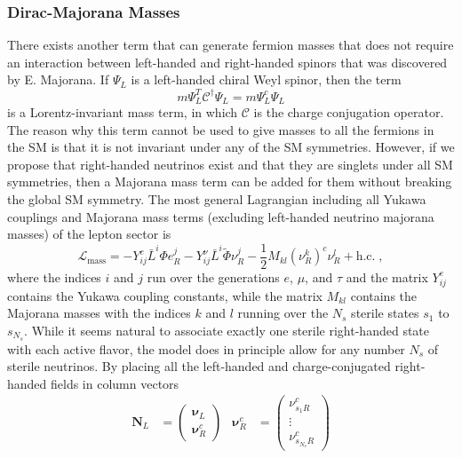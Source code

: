 \subsubsection{Dirac-Majorana Masses}

There exists another term that can generate fermion masses that does not require an interaction between left-handed and right-handed spinors that was discovered by E. Majorana. If $\Psi_L$ is a left-handed chiral Weyl spinor, then the term
\begin{equation}
   m \Psi_L^T \mathcal{C}^\dag \Psi_L = m \Psi_L^c \Psi_L
\end{equation}
is a Lorentz-invariant mass term, in which $\mathcal{C}$ is the charge conjugation operator. The reason why this term cannot be used to give masses to all the fermions in the SM is that it is not invariant under any of the SM symmetries. However, if we propose that right-handed neutrinos exist and that they are singlets under all SM symmetries, then a Majorana mass term can be added for them without breaking the global SM symmetry. The most general Lagrangian including all Yukawa couplings and Majorana mass terms (excluding left-handed neutrino majorana masses) of the lepton sector is
\begin{equation}
  \mathcal{L}_\mathrm{mass} = -Y_{ij}^e \bar{L}^i \Phi e_R^j - Y_{ij}^\nu \bar{L}^i \tilde{\Phi} \nu_R^j - \frac{1}{2}M_{kl}(\nu_R^k)^c \nu_R^l + \mathrm{h.c.}\;,
\end{equation}
where the indices $i$ and $j$ run over the generations $e$, $\mu$, and $\tau$ and the matrix $Y_{ij}^e$ contains the Yukawa coupling constants, while the matrix $M_{kl}$ contains the Majorana masses with the indices $k$ and $l$ running over the $N_s$ sterile states $s_1$ to $s_{N_s}$. While it seems natural to associate exactly one sterile right-handed state with each active flavor, the model does in principle allow for any number $N_s$ of sterile neutrinos. By placing all the left-handed and charge-conjugated right-handed fields in column vectors
\begin{equation}
\begin{aligned}
  \boldsymbol{N}_L &= \begin{pmatrix} \boldsymbol{\nu}_L \\ \boldsymbol{\nu}_R^c \end{pmatrix}
  &\boldsymbol{\nu}_R^c  &= \begin{pmatrix}\nu_{s_{1} R}^c \\ \vdots \\ \nu_{s_{N_{s}} R}^c\end{pmatrix}
\end{aligned}
\end{equation}

